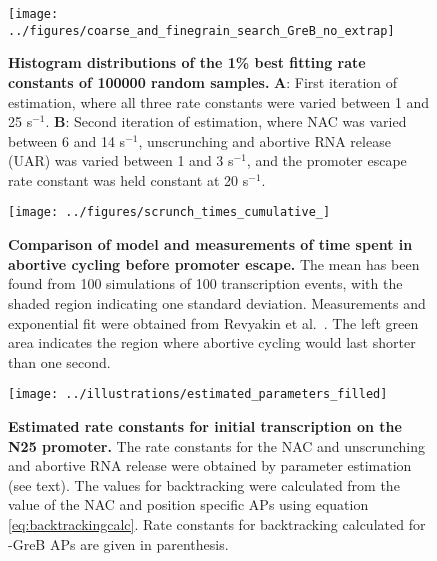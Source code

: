 \begin{figure}[h]
    \begin{center}
      \texttt{[image: ../figures/coarse\_and\_finegrain\_search\_GreB\_no\_extrap]}
    \end{center}
  \caption{ {\bf Histogram distributions of the 1\% best fitting rate
    constants of 100000 random samples.} \textbf{A}: First iteration of
    estimation, where all three rate constants were varied between 1 and 25
    s$^{-1}$. \textbf{B}: Second iteration of estimation, where NAC was varied
    between 6 and 14 s$^{-1}$, unscrunching and abortive RNA release (UAR)
    was varied between 1 and 3 s$^{-1}$, and the promoter escape rate constant was
    held constant at 20 s$^{-1}$.}
    \label{fig:parameter_estimation_proper}
\end{figure}

\begin{figure}[h]
    \begin{center}
      \texttt{[image: ../figures/scrunch\_times\_cumulative\_]}
    \end{center}
  \caption{{\bf Comparison of model and measurements of time spent in abortive
        cycling before promoter escape.} The mean has been found from 100
        simulations of 100 transcription events, with the shaded region
        indicating one standard deviation. Measurements and exponential fit
        were obtained from Revyakin et al.\ \cite{revyakin_abortive_2006}. The
        left green area indicates the region where abortive cycling would last
        shorter than one second.}
\label{fig:revyakin_fit}
\end{figure}

\begin{figure}[h]
    \begin{center}
      \texttt{[image: ../illustrations/estimated\_parameters\_filled]}
    \end{center}
    \caption{ {\bf Estimated rate constants for initial transcription on the N25
      promoter.} The rate constants for the NAC and unscrunching and abortive
      RNA release were obtained by parameter estimation (see text). The values
      for backtracking were calculated from the value of the NAC and position
      specific APs using equation \eqref{eq:backtrackingcalc}. Rate constants
      for backtracking calculated for -GreB APs are given in parenthesis.}
    \label{fig:estimated_parameters}
\end{figure}

